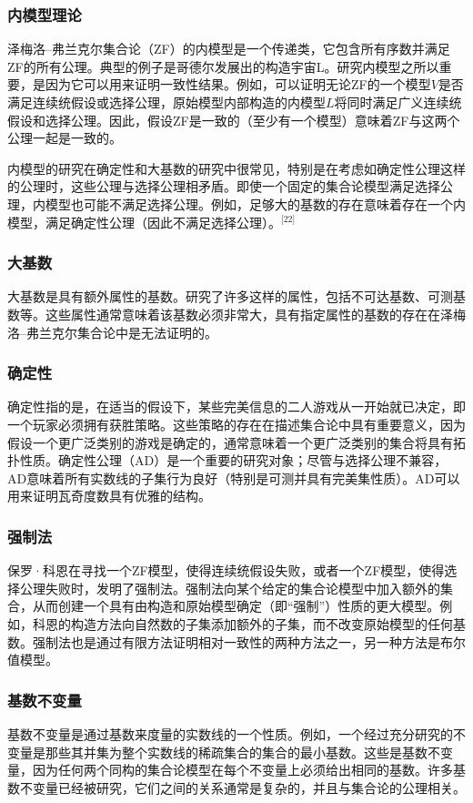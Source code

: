 \subsubsection{内模型理论} 
泽梅洛–弗兰克尔集合论（ZF）的内模型是一个传递类，它包含所有序数并满足ZF的所有公理。典型的例子是哥德尔发展出的构造宇宙L。研究内模型之所以重要，是因为它可以用来证明一致性结果。例如，可以证明无论ZF的一个模型$V$是否满足连续统假设或选择公理，原始模型内部构造的内模型$L$将同时满足广义连续统假设和选择公理。因此，假设ZF是一致的（至少有一个模型）意味着ZF与这两个公理一起是一致的。

内模型的研究在确定性和大基数的研究中很常见，特别是在考虑如确定性公理这样的公理时，这些公理与选择公理相矛盾。即使一个固定的集合论模型满足选择公理，内模型也可能不满足选择公理。例如，足够大的基数的存在意味着存在一个内模型，满足确定性公理（因此不满足选择公理）。\(^\text{[22]}\)
\subsubsection{大基数}  
大基数是具有额外属性的基数。研究了许多这样的属性，包括不可达基数、可测基数等。这些属性通常意味着该基数必须非常大，具有指定属性的基数的存在在泽梅洛–弗兰克尔集合论中是无法证明的。
\subsubsection{确定性}  
确定性指的是，在适当的假设下，某些完美信息的二人游戏从一开始就已决定，即一个玩家必须拥有获胜策略。这些策略的存在在描述集合论中具有重要意义，因为假设一个更广泛类别的游戏是确定的，通常意味着一个更广泛类别的集合将具有拓扑性质。确定性公理（AD）是一个重要的研究对象；尽管与选择公理不兼容，AD意味着所有实数线的子集行为良好（特别是可测并具有完美集性质）。AD可以用来证明瓦奇度数具有优雅的结构。
\subsubsection{强制法}  
保罗·科恩在寻找一个ZF模型，使得连续统假设失败，或者一个ZF模型，使得选择公理失败时，发明了强制法。强制法向某个给定的集合论模型中加入额外的集合，从而创建一个具有由构造和原始模型确定（即“强制”）性质的更大模型。例如，科恩的构造方法向自然数的子集添加额外的子集，而不改变原始模型的任何基数。强制法也是通过有限方法证明相对一致性的两种方法之一，另一种方法是布尔值模型。
\subsubsection{基数不变量} 
基数不变量是通过基数来度量的实数线的一个性质。例如，一个经过充分研究的不变量是那些其并集为整个实数线的稀疏集合的集合的最小基数。这些是基数不变量，因为任何两个同构的集合论模型在每个不变量上必须给出相同的基数。许多基数不变量已经被研究，它们之间的关系通常是复杂的，并且与集合论的公理相关。

